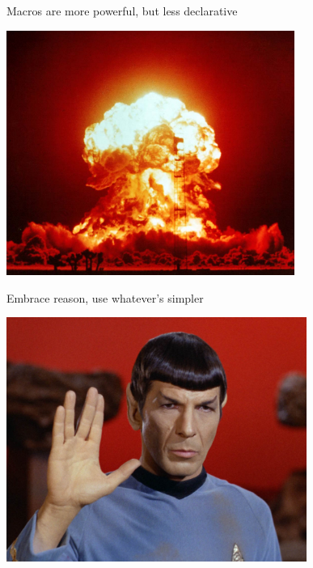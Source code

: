 \documentclass{beamer}
\begin{document}
\begin{frame}[fragile]{Macros are more powerful, but less declarative}
  \begin{center}
    \includegraphics[height=8cm]{img/boom.jpg}
  \end{center}
\end{frame}

\begin{frame}[fragile]{Embrace reason, use whatever's simpler}
  \begin{center}
    \includegraphics[height=8cm]{img/spock.jpg}
  \end{center}
\end{frame}
\end{document}
